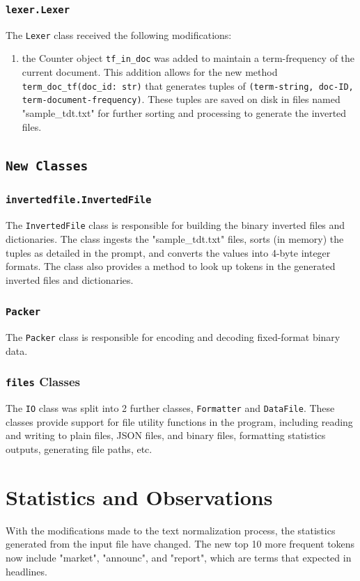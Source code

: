 \documentclass[11pt]{article}
\begin{document}
\subsubsection{\texttt{lexer.Lexer}}
The \texttt{Lexer} class received the following modifications:
\begin{enumerate}
    \item the Counter object \texttt{tf\_in\_doc} was added to maintain a term-frequency of the current document. This addition allows for the new method \texttt{term\_doc\_tf(doc\_id: str)} that generates tuples of \texttt{(term-string, doc-ID, term-document-frequency)}. These tuples are saved on disk in files named "sample\_tdt.txt" for further sorting and processing to generate the inverted files.
\end{enumerate}

\subsection{\texttt{New Classes}}

\subsubsection{\texttt{invertedfile.InvertedFile}}
The \texttt{InvertedFile} class is responsible for building the binary inverted files and dictionaries. The class ingests the "sample\_tdt.txt" files, sorts (in memory) the tuples as detailed in the prompt, and converts the values into 4-byte integer formats. The class also provides a method to look up tokens in the generated inverted files and dictionaries.

\subsubsection{\texttt{Packer}}
The \texttt{Packer} class is responsible for encoding and decoding fixed-format binary data.

\subsubsection{\texttt{files} Classes}
The \texttt{IO} class was split into 2 further classes, \texttt{Formatter} and \texttt{DataFile}. These classes provide support for file utility functions in the program, including reading and writing to plain files, JSON files, and binary files, formatting statistics outputs, generating file paths, etc.

\section{Statistics and Observations}
With the modifications made to the text normalization process, the statistics generated from the input file have changed. The new top 10 more frequent tokens now include "market", "announc", and "report", which are terms that expected in headlines.
\end{document}
